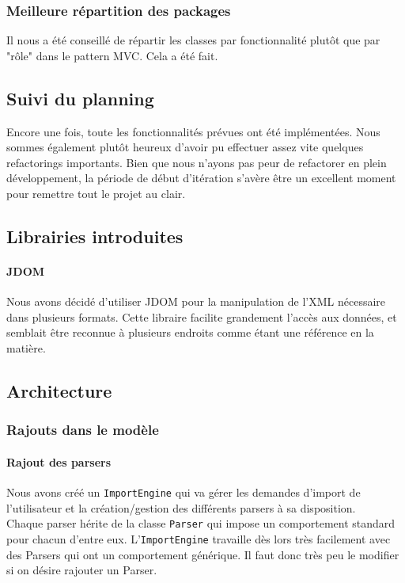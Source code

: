 	\subsubsection{Meilleure répartition des packages}
	Il nous a été conseillé de répartir les classes par fonctionnalité plutôt
	que par "rôle" dans le pattern MVC. Cela a été fait.


\subsection{Suivi du planning}
Encore une fois, toute les fonctionnalités prévues ont été implémentées. Nous 
sommes également plutôt heureux d'avoir pu effectuer assez vite quelques 
refactorings importants. Bien que nous n'ayons pas peur de refactorer en plein 
développement, la période de début d'itération s'avère être un excellent moment 
pour remettre tout le projet au clair.


\subsection{Librairies introduites}

\paragraph{JDOM}
Nous avons décidé d'utiliser JDOM pour la manipulation de l'XML nécessaire dans
plusieurs formats. Cette libraire facilite grandement l'accès aux données, et 
semblait être reconnue à plusieurs endroits comme étant une référence en la matière.


\subsection{Architecture}
	
	\subsubsection{Rajouts dans le modèle}

		\paragraph{Rajout des parsers}
		Nous avons créé un \texttt{ImportEngine} qui va gérer les demandes 
		d'import de l'utilisateur et la création/gestion des différents parsers 
		à sa disposition. \\

		Chaque parser hérite de la classe \texttt{Parser} qui impose un comportement
		standard pour chacun d'entre eux. L'\texttt{ImportEngine} travaille dès
		lors très facilement avec des Parsers qui ont un comportement générique.
		Il faut donc très peu le modifier si on désire rajouter un Parser.\\

